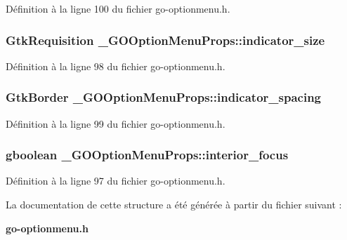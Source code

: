 Définition à la ligne 100 du fichier go-\/optionmenu.h.

\subsubsection[{indicator\_\-size}]{\setlength{\rightskip}{0pt plus 5cm}GtkRequisition {\bf \_\-GOOptionMenuProps::indicator\_\-size}}\label{struct__GOOptionMenuProps_a92d0949910d76dee18d7d9aaf68b7312}


Définition à la ligne 98 du fichier go-\/optionmenu.h.

\subsubsection[{indicator\_\-spacing}]{\setlength{\rightskip}{0pt plus 5cm}GtkBorder {\bf \_\-GOOptionMenuProps::indicator\_\-spacing}}\label{struct__GOOptionMenuProps_a4cc49d8195ef9e78d1e56e190e20b488}


Définition à la ligne 99 du fichier go-\/optionmenu.h.

\subsubsection[{interior\_\-focus}]{\setlength{\rightskip}{0pt plus 5cm}gboolean {\bf \_\-GOOptionMenuProps::interior\_\-focus}}\label{struct__GOOptionMenuProps_a1ae09f1e4ad5ab9168a92276c44e0acc}


Définition à la ligne 97 du fichier go-\/optionmenu.h.



La documentation de cette structure a été générée à partir du fichier suivant :\begin{DoxyCompactItemize}
\item 
{\bf go-\/optionmenu.h}\end{DoxyCompactItemize}
